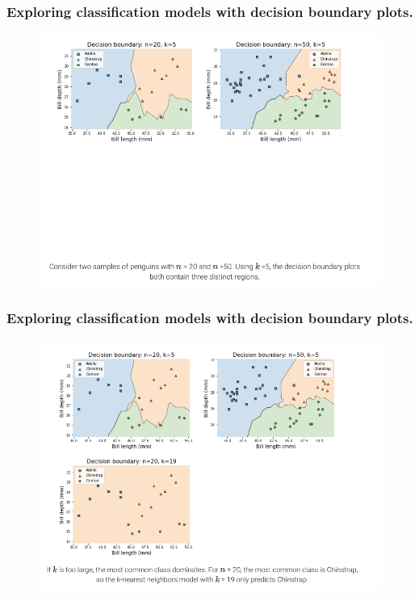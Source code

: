 \documentclass[8pt,dvipsnames]{beamer}
\begin{document}
\begin{frame}
	\frametitle{Exploring classification models with decision boundary plots.}
	\begin{figure}[ht]
		\centering
		\includegraphics[width=\linewidth]{imgs/knn_29.png}
	\end{figure}
\end{frame}

\begin{frame}
	\frametitle{Exploring classification models with decision boundary plots.}
	\begin{figure}[ht]
		\centering
		\includegraphics[width=\linewidth]{imgs/knn_30.png}
	\end{figure}
\end{frame}
\end{document}
